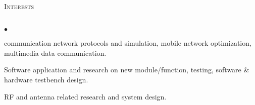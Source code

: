 \documentclass{article}
\newcommand{\lineunder}{\vspace*{-8pt} \\ \hspace*{-18pt} \hrulefill \\}
\newcommand{\header}[1]{{\hspace*{-15pt}\vspace*{6pt} \textsc{#1}} \vspace*{-6pt} \lineunder}
\newenvironment{achievements}{\begin{list}{$\bullet$}{\topsep 0pt \itemsep -2pt}}{\vspace*{4pt}\end{list}}
\begin{document}
\header{Interests}
\begin{achievements}
\item communication network protocols and simulation, mobile network optimization, multimedia data communication.
\item Software application and research on new module/function, testing, software \& hardware testbench design.
\item RF and antenna related research and system design.

\end{achievements}
\end{document}

